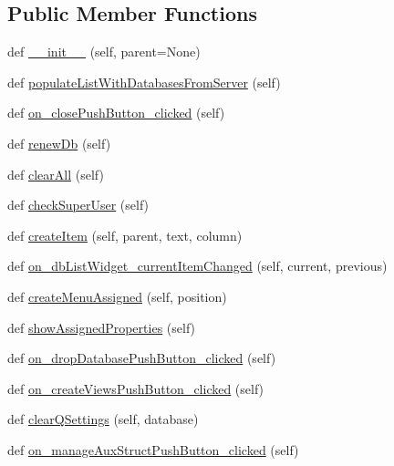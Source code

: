 \subsection*{Public Member Functions}
\begin{DoxyCompactItemize}
\item 
def \mbox{\hyperlink{class_dsg_tools_1_1_server_tools_1_1explore_db_1_1_explore_db_a8093d338ae06bf10048cf67eb963190a}{\+\_\+\+\_\+init\+\_\+\+\_\+}} (self, parent=None)
\item 
def \mbox{\hyperlink{class_dsg_tools_1_1_server_tools_1_1explore_db_1_1_explore_db_a92e2b2f1b14fdcd6e227da04ad5e4309}{populate\+List\+With\+Databases\+From\+Server}} (self)
\item 
def \mbox{\hyperlink{class_dsg_tools_1_1_server_tools_1_1explore_db_1_1_explore_db_aa15d42028000d63f7dffe60405edade4}{on\+\_\+close\+Push\+Button\+\_\+clicked}} (self)
\item 
def \mbox{\hyperlink{class_dsg_tools_1_1_server_tools_1_1explore_db_1_1_explore_db_a98e476625fcaa5decfe1a37a3871514c}{renew\+Db}} (self)
\item 
def \mbox{\hyperlink{class_dsg_tools_1_1_server_tools_1_1explore_db_1_1_explore_db_a206527b9629e7cf40d355230e959b4ee}{clear\+All}} (self)
\item 
def \mbox{\hyperlink{class_dsg_tools_1_1_server_tools_1_1explore_db_1_1_explore_db_ae81421cf0a3d7dff4905f2c14001643a}{check\+Super\+User}} (self)
\item 
def \mbox{\hyperlink{class_dsg_tools_1_1_server_tools_1_1explore_db_1_1_explore_db_a526574416eadb2311ed5ce6fccced60e}{create\+Item}} (self, parent, text, column)
\item 
def \mbox{\hyperlink{class_dsg_tools_1_1_server_tools_1_1explore_db_1_1_explore_db_a2da649b909fe26258c7bbc69063b6a50}{on\+\_\+db\+List\+Widget\+\_\+current\+Item\+Changed}} (self, current, previous)
\item 
def \mbox{\hyperlink{class_dsg_tools_1_1_server_tools_1_1explore_db_1_1_explore_db_a8f2a2a5c58fcd3212e350caf0b089775}{create\+Menu\+Assigned}} (self, position)
\item 
def \mbox{\hyperlink{class_dsg_tools_1_1_server_tools_1_1explore_db_1_1_explore_db_a6294868955f1101541f57b97faeadbf3}{show\+Assigned\+Properties}} (self)
\item 
def \mbox{\hyperlink{class_dsg_tools_1_1_server_tools_1_1explore_db_1_1_explore_db_af889de9b8f68501bb60a088fe1523d5a}{on\+\_\+drop\+Database\+Push\+Button\+\_\+clicked}} (self)
\item 
def \mbox{\hyperlink{class_dsg_tools_1_1_server_tools_1_1explore_db_1_1_explore_db_a810a5f5ad7a4975e0d9db04df7b5631d}{on\+\_\+create\+Views\+Push\+Button\+\_\+clicked}} (self)
\item 
def \mbox{\hyperlink{class_dsg_tools_1_1_server_tools_1_1explore_db_1_1_explore_db_a2f5bb5f62f93bc8eeaf4201934cba182}{clear\+Q\+Settings}} (self, database)
\item 
def \mbox{\hyperlink{class_dsg_tools_1_1_server_tools_1_1explore_db_1_1_explore_db_a738d6d63f19fa42032b3db3af95faf51}{on\+\_\+manage\+Aux\+Struct\+Push\+Button\+\_\+clicked}} (self)
\end{DoxyCompactItemize}
